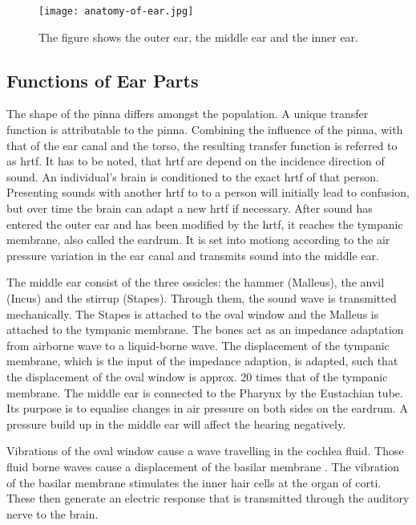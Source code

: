  \begin{figure}[H]
	\centering
		\texttt{[image: anatomy-of-ear.jpg]}
		\caption{The figure shows the outer ear, the middle ear and the inner ear.}
		\label{fig:hearing_system}
\end{figure}

\subsection{Functions of Ear Parts}\label{sec:ear_functions}
The shape of the pinna differs amongst the population. A unique transfer function is attributable to the pinna. Combining the influence of the pinna, with that of the ear canal and the torso, the resulting transfer function is referred to as \gls{hrtf}. It has to be noted, that \gls{hrtf} are depend on the incidence direction of sound. An individual's brain is conditioned to the exact \gls{hrtf} of that person. Presenting sounds with another \gls{hrtf} to to a person will initially lead to confusion, but over time the brain can adapt a new \gls{hrtf} if necessary. After sound has entered the outer ear and has been modified by the \gls{hrtf}, it reaches the tympanic membrane, also called the eardrum. It is set into motiong according to the air pressure variation in the ear canal and transmits sound into the middle ear.  

The middle ear consist of the three ossicles: the hammer (Malleus), the anvil (Incus) and the stirrup (Stapes). Through them, the sound wave is transmitted mechanically. The Stapes is attached to the oval window and the Malleus is attached to the tympanic membrane. The bones act as an impedance adaptation from airborne wave to a liquid-borne wave. The displacement of the tympanic membrane, which is the input of the impedance adaption, is adapted, such that the displacement of the oval window is approx. 20 times that of the tympanic membrane. The middle ear is connected to the Pharynx by the Eustachian tube. Its purpose is to equalise changes in air pressure on both sides on the eardrum. A pressure build up in the middle ear will affect the hearing negatively. 

Vibrations of the oval window cause a wave travelling in the cochlea fluid. Those fluid borne waves cause a displacement of the basilar membrane \citep{ho_2017}. The vibration of the basilar membrane stimulates the inner hair cells at the organ of corti. These then generate an electric response that is transmitted through the auditory nerve to the brain.



